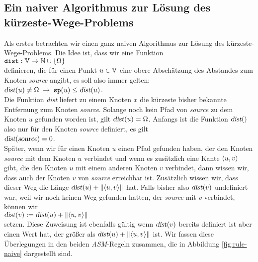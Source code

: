 \subsection{Ein naiver Algorithmus zur L\"osung des k\"urzeste-Wege-Problems}
Als erstes betrachten wir einen ganz naiven Algorithmus zur L\"osung des k\"urzeste-Wege-Problems.
Die Idee ist, dass wir eine Funktion \\[0.2cm]
\hspace*{1.3cm} $\texttt{dist}: {\mathbb V} \rightarrow {\mathbb N} \cup \{\Omega\}$ \\[0.2cm]
definieren, die f\"ur einen Punkt $u \in {\mathbb V}$ eine obere Absch\"atzung des Abstandes zum Knoten
\textsl{source} angibt, es soll also immer gelten: \\[0.2cm]
\hspace*{1.3cm} $\textsl{dist}(u) \not= \Omega \;\rightarrow\; \mbox{\tt sp}(u) \leq
\textsl{dist}(u)$. \\[0.2cm]
Die Funktion \textsl{dist} liefert zu einem Knoten $x$ die k\"urzeste bisher
bekannte Entfernung zum Knoten \textsl{source}.  Solange noch kein Pfad von
\textsl{source} zu dem Knoten $u$ gefunden worden ist, gilt $\textsl{dist}(u) = \Omega$.
Anfangs ist die Funktion $\textsl{dist}()$ also nur f\"ur den Knoten \textsl{source}
definiert, es gilt \\[0.2cm]
\hspace*{1.3cm} $\textsl{dist}(\textsl{source}) = 0$. \\[0.2cm]
Sp\"ater, wenn wir f\"ur einen Knoten $u$ einen Pfad gefunden haben, der den Knoten
\textsl{source} mit dem Knoten $u$ verbindet und wenn es zus\"atzlich eine Kante
$\pair(u,v)$ gibt, die den Knoten $u$ mit einem anderen Knoten $v$ verbindet, dann wissen
wir, dass auch der Knoten $v$ von \textsl{source} erreichbar ist.  Zus\"atzlich wissen wir,
dass dieser Weg die L\"ange $\textsl{dist}(u) + \weight{\pair(u,v)}$ hat.  Falls bisher also
$\textsl{dist}(v)$ undefiniert war, weil wir noch keinen Weg gefunden hatten, der
\textsl{source} mit $v$ verbindet, k\"onnen wir \\
\hspace*{1.3cm} $\textsl{dist}(v) := \textsl{dist}(u) + \weight{\pair(u,v)}$ \\[0.2cm]
setzen.  Diese Zuweisung ist ebenfalls g\"ultig wenn $\textsl{dist}(v)$ bereits definiert
ist aber einen Wert hat, der gr\"o{\ss}er als $\textsl{dist}(u) + \weight{\pair(u,v)}$ ist.
Wir fassen diese Überlegungen in den beiden
\textsl{ASM}-Regeln zusammen, die in Abbildung \ref{fig:rule-naive} dargestellt sind.  
